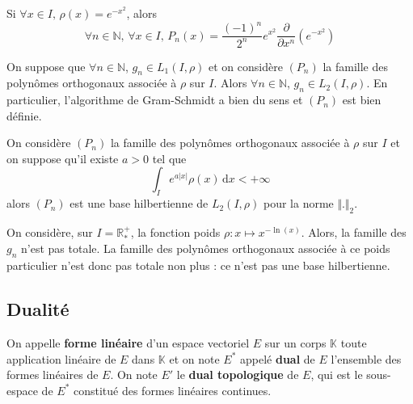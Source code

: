   \begin{example}
    Si $\forall x \in I, \, \rho(x) = e^{-x^2}$, alors
    \[ \forall n \in \mathbb{N}, \, \forall x \in I, \, P_n(x) = \frac{(-1)^n}{2^n} e^{x^2} \frac{\partial}{\partial x^n} \left( e^{-x^2} \right) \]
  \end{example}


  \begin{lemma}
    On suppose que $\forall n \in \mathbb{N}$, $g_n \in L_1(I, \rho)$ et on considère $(P_n)$ la famille des polynômes orthogonaux associée à $\rho$ sur $I$. Alors $\forall n \in \mathbb{N}$, $g_n \in L_2(I, \rho)$. En particulier, l'algorithme de Gram-Schmidt a bien du sens et $(P_n)$ est bien définie.
  \end{lemma}

  \begin{application}
    On considère $(P_n)$ la famille des polynômes orthogonaux associée à $\rho$ sur $I$ et on suppose qu'il existe $a > 0$ tel que
    \[ \int_I e^{a \vert x \vert} \rho(x) \, \mathrm{d}x < +\infty \]
    alors $(P_n)$ est une base hilbertienne de $L_2(I, \rho)$ pour la norme $\Vert . \Vert_2$.
  \end{application}

  \begin{cexample}
    On considère, sur $I = \mathbb{R}^+_*$, la fonction poids $\rho : x \mapsto x^{-\ln(x)}$. Alors, la famille des $g_n$ n'est pas totale. La famille des polynômes orthogonaux associée à ce poids particulier n'est donc pas totale non plus : ce n'est pas une base hilbertienne.
  \end{cexample}

  \subsection{Dualité}


  \begin{definition}
    On appelle \textbf{forme linéaire} d'un espace vectoriel $E$ sur un corps $\mathbb{K}$ toute application linéaire de $E$ dans $\mathbb{K}$ et on note $E^*$ appelé \textbf{dual} de $E$ l'ensemble des formes linéaires de $E$.
    \newpar
    On note $E'$ le \textbf{dual topologique} de $E$, qui est le sous-espace de $E^*$ constitué des formes linéaires continues.
  \end{definition}

